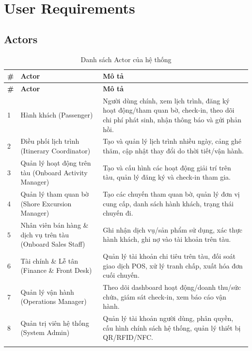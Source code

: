 \section{User Requirements}

\subsection{Actors}

\begin{longtable}{|p{0.6cm}|p{3.1cm}|p{8.4cm}|}
    \hline
    \textbf{\#} & \textbf{Actor} & \textbf{Mô tả} \\
    \hline
    \endfirsthead
    \hline
    \textbf{\#} & \textbf{Actor} & \textbf{Mô tả} \\
    \hline
    \endhead
    1 & Hành khách (Passenger) & Người dùng chính, xem lịch trình, đăng ký
    hoạt động/tham quan bờ, check-in, theo dõi chi phí phát sinh, nhận thông
    báo và gửi phản hồi. \\
    \hline
    2 & Điều phối lịch trình (Itinerary Coordinator) & Tạo và quản lý lịch
    trình nhiều ngày, cảng ghé thăm, cập nhật thay đổi do thời tiết/vận
    hành. \\
    \hline
    3 & Quản lý hoạt động trên tàu (Onboard Activity Manager) & Tạo và cấu
    hình các hoạt động giải trí trên tàu, quản lý đăng ký và check-in tham
    gia. \\
    \hline
    4 & Quản lý tham quan bờ (Shore Excursion Manager) & Tạo các chuyến
    tham quan bờ, quản lý đơn vị cung cấp, danh sách hành khách, trạng thái
    chuyến đi. \\
    \hline
    5 & Nhân viên bán hàng \& dịch vụ trên tàu (Onboard Sales Staff) & Ghi
    nhận dịch vụ/sản phẩm sử dụng, xác thực hành khách, ghi nợ vào tài khoản
    trên tàu. \\
    \hline
    6 & Tài chính \& Lễ tân (Finance \& Front Desk) & Quản lý tài khoản chi
    tiêu trên tàu, đối soát giao dịch POS, xử lý tranh chấp, xuất hóa đơn
    cuối chuyến. \\
    \hline
    7 & Quản lý vận hành (Operations Manager) & Theo dõi dashboard hoạt
    động/doanh thu/sức chứa, giám sát check-in, xem báo cáo vận hành. \\
    \hline
    8 & Quản trị viên hệ thống (System Admin) & Quản lý tài khoản người
    dùng, phân quyền, cấu hình chính sách hệ thống, quản lý thiết bị
    QR/RFID/NFC. \\
    \hline
    \caption{Danh sách Actor của hệ thống}
    \label{tab:actors}
\end{longtable}

